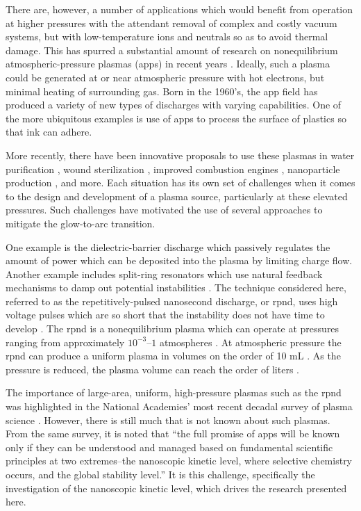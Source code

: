 There are, however, a number of applications which would benefit from operation
at higher pressures with the attendant removal of complex and costly vacuum
systems, but with low-temperature ions and neutrals so as to avoid thermal
damage. This has spurred a substantial amount of research on nonequilibrium
atmospheric-pressure plasmas (\acs{app}s) in recent years \cite{Becker2005,
Starikovskii2009, Nishihara2011, Laroussi2005, Walsh2006, Lu2006}. Ideally, such
a plasma could be generated at or near atmospheric pressure with hot electrons,
but minimal heating of surrounding gas. Born in the 1960's, the \acs{app} field
has produced a variety of new types of discharges with varying capabilities. One
of the more ubiquitous examples is use of \acs{app}s to process the surface of
plastics so that ink can adhere.

More recently, there have been innovative proposals to use these plasmas in
water purification \cite{Malik2001}, wound sterilization \cite{Ayan2009},
improved combustion engines \cite{Nishihara2007}, nanoparticle production
\cite{Ostrikov2011}, and more. Each situation has its own set of challenges when
it comes to the design and development of a plasma source, particularly at these
elevated pressures. Such challenges have motivated the use of several approaches
to mitigate the glow-to-arc transition.

One example is the dielectric-barrier discharge which passively regulates the
amount of power which can be deposited into the plasma \cite{Kogelschatz2003} by
limiting charge flow. Another example includes split-ring resonators which use
natural feedback mechanisms to damp out potential instabilities \cite{Iza2005}.
The technique considered here, referred to as the repetitively-pulsed nanosecond
discharge, or \acs{rpnd}, uses high voltage pulses which are so short that the
instability does not have time to develop \cite{Adamovich2008}. The \acs{rpnd}
is a nonequilibrium plasma which can operate at pressures ranging from
approximately $10^{-3}$--$1$ atmospheres \cite{Vasilyak1994}. At atmospheric
pressure the \acs{rpnd} can produce a uniform plasma in volumes on the order of
10 mL \cite{Walsh2006}. As the pressure is reduced, the plasma volume can reach
the order of liters \cite{Starikovskaia1998}.

The importance of large-area, uniform, high-pressure plasmas such as the
\acs{rpnd} was highlighted in the National Academies' most recent decadal survey
of plasma science \cite{NA2007}. However, there is still much that is not known
about such plasmas. From the same survey, it is noted that ``the full promise of
\acs{app}s will be known only if they can be understood and managed based on
fundamental scientific principles at two extremes--the nanoscopic kinetic level,
where selective chemistry occurs, and the global stability level.'' It is this
challenge, specifically the investigation of the nanoscopic kinetic level, which
drives the research presented here.

